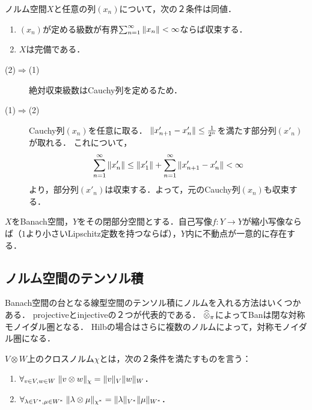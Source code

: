 \documentclass[uplatex,dvipdfmx]{jsreport}
\begin{document}
\begin{theorem}[絶対収束級数なるクラスの定義]
    ノルム空間$X$と任意の列$(x_n)$について，次の２条件は同値．
    \begin{enumerate}
        \item $(x_n)$が定める級数が有界$\sum^\infty_{n=1}\|x_n\|<\infty$ならば収束する．
        \item $X$は完備である．
    \end{enumerate}
\end{theorem}
\begin{Proof}\mbox{}
    \begin{description}
        \item[(2)$\Rightarrow$(1)] 絶対収束級数はCauchy列を定めるため．
        \item[(1)$\Rightarrow$(2)] Cauchy列$(x_n)$を任意に取る．
        $\|x'_{n+1}-x'_n\|\le\frac{1}{2^n}$を満たす部分列$(x'_n)$が取れる．
        これについて，
        \[\sum_{n=1}^\infty\|x'_n\|\le\|x'_1\|+\sum_{n=1}^\infty\|x'_{n+1}-x'_n\|<\infty\]
        より，部分列$(x'_n)$は収束する．よって，元のCauchy列$(x_n)$も収束する．
    \end{description}
\end{Proof}

\begin{theorem}[不動点定理]
    $X$をBanach空間，$Y$をその閉部分空間とする．自己写像$f:Y\to Y$が縮小写像ならば（$1$より小さいLipschitz定数を持つならば），$Y$内に不動点が一意的に存在する．
\end{theorem}

\subsection{ノルム空間のテンソル積}

\begin{tcolorbox}[colframe=ForestGreen, colback=ForestGreen!10!white,breakable,colbacktitle=ForestGreen!40!white,coltitle=black,fonttitle=\bfseries\sffamily,
title=]
    Banach空間の台となる線型空間のテンソル積にノルムを入れる方法はいくつかある．
    projectiveとinjectiveの２つが代表的である．
    $\widehat{\otimes}_\pi$によってBanは閉な対称モノイダル圏となる．
    Hilbの場合はさらに複数のノルムによって，対称モノイダル圏になる．
\end{tcolorbox}

\begin{definition}
    $V\otimes W$上のクロスノルム$\chi$とは，次の２条件を満たすものを言う：
    \begin{enumerate}
        \item $\forall_{v\in V,w\in W}\;\|v\otimes w\|_\chi=\|v\|_V\|w\|_W$．
        \item $\forall_{\lambda\in V^*,\mu\in W^*}\;\|\lambda\otimes\mu\|_{\chi^*}=\|\lambda\|_{V^*}\|\mu\|_{W^*}$．
    \end{enumerate}
\end{definition}
\end{document}

